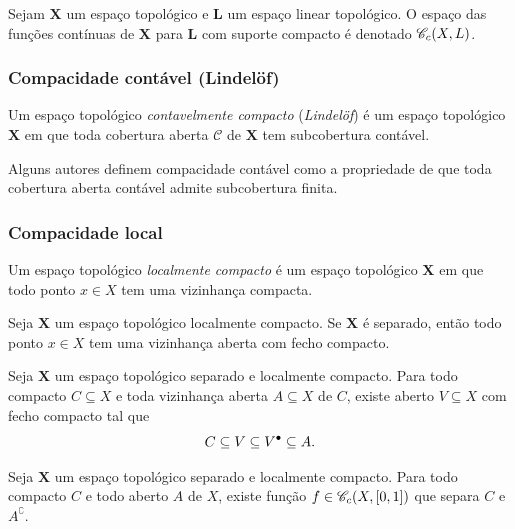 \begin{definition}
Sejam $\bm X$ um espaço topológico e $\bm L$ um espaço linear topológico. O espaço das funções contínuas de $\bm X$ para $\bm L$ com suporte compacto é denotado $\mathscr{C}_c(X,L)$.
\end{definition}

\subsubsection{Compacidade contável (Lindelöf)}

\begin{definition}
Um espaço topológico \emph{contavelmente compacto} (\emph{Lindelöf}) é um espaço topológico $\bm X$ em que toda cobertura aberta $\mathcal C$ de $\bm X$ tem subcobertura contável.
\end{definition}

Alguns autores definem compacidade contável como a propriedade de que toda cobertura aberta contável admite subcobertura finita.

\subsubsection{Compacidade local}

\begin{definition}
Um espaço topológico \emph{localmente compacto} é um espaço topológico $\bm X$ em que todo ponto $x \in X$ tem uma vizinhança compacta.
\end{definition}

\begin{proposition}
Seja $\bm X$ um espaço topológico localmente compacto. Se $\bm X$ é separado, então todo ponto $x \in X$ tem uma vizinhança aberta com fecho compacto.
\end{proposition}

\begin{proposition}
Seja $\bm X$ um espaço topológico separado e localmente compacto. Para todo compacto $C \subseteq X$ e toda vizinhança aberta $A \subseteq X$ de $C$, existe aberto $V \subseteq X$ com fecho compacto tal que
	\begin{equation*}
	C \subseteq V \subseteq {V}^\bullet \subseteq A.
	\end{equation*}
\end{proposition}

\begin{proposition}
Seja $\bm X$ um espaço topológico separado e localmente compacto. Para todo compacto $C$ e todo aberto $A$ de $X$, existe função $f \in \mathscr{C}_c(X,\left[{0},{1}\right])$ que separa $C$ e $A^\complement$.
\end{proposition}


